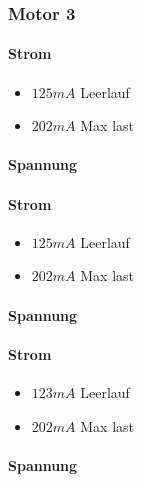 \documentclass{article}
\begin{document}
\subsubsection{Motor 3}

\paragraph{Strom}

\begin{itemize}

\item $125 mA$ Leerlauf

\item $202 mA$ Max last

\end{itemize}

\paragraph{Spannung}


\paragraph{Strom}

\begin{itemize}

\item $125 mA$ Leerlauf

\item $202 mA$ Max last

\end{itemize}

\paragraph{Spannung}




\paragraph{Strom}

\begin{itemize}

\item $123 mA$ Leerlauf

\item $202 mA$ Max last

\end{itemize}

\paragraph{Spannung}
\end{document}

